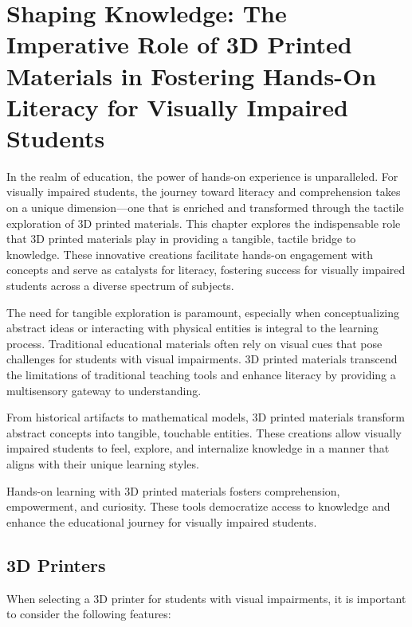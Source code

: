 \chapter{Shaping Knowledge: The Imperative Role of 3D Printed Materials in Fostering Hands-On Literacy for Visually Impaired Students}\label{chap:3d-printed-materials}

In the realm of education, the power of hands-on experience is unparalleled. For visually impaired students, the journey toward literacy and comprehension takes on a unique dimension—one that is enriched and transformed through the tactile exploration of 3D printed materials. This chapter explores the indispensable role that 3D printed materials play in providing a tangible, tactile bridge to knowledge. These innovative creations facilitate hands-on engagement with concepts and serve as catalysts for literacy, fostering success for visually impaired students across a diverse spectrum of subjects.

The need for tangible exploration is paramount, especially when conceptualizing abstract ideas or interacting with physical entities is integral to the learning process. Traditional educational materials often rely on visual cues that pose challenges for students with visual impairments. 3D printed materials transcend the limitations of traditional teaching tools and enhance literacy by providing a multisensory gateway to understanding.

From historical artifacts to mathematical models, 3D printed materials transform abstract concepts into tangible, touchable entities. These creations allow visually impaired students to feel, explore, and internalize knowledge in a manner that aligns with their unique learning styles.

Hands-on learning with 3D printed materials fosters comprehension, empowerment, and curiosity. These tools democratize access to knowledge and enhance the educational journey for visually impaired students.

\section{3D Printers}\label{sec:3d-printers}
When selecting a 3D printer for students with visual impairments, it is important to consider the following features:

